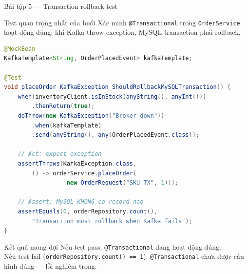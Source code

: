 \documentclass[aspectratio=169,10pt]{beamer}
\begin{document}
\begin{frame}[fragile]{Bài tập 5 --- Transaction rollback test}
  \begin{block}{Test quan trọng nhất của buổi}
    Xác minh \texttt{@Transactional} trong \texttt{OrderService} hoạt động đúng:
    khi Kafka throw exception, MySQL transaction phải rollback.
  \end{block}

\begin{lstlisting}[language=Java]
@MockBean
KafkaTemplate<String, OrderPlacedEvent> kafkaTemplate;

@Test
void placeOrder_KafkaException_ShouldRollbackMySQLTransaction() {
    when(inventoryClient.isInStock(anyString(), anyInt()))
        .thenReturn(true);
    doThrow(new KafkaException("Broker down"))
        .when(kafkaTemplate)
        .send(anyString(), any(OrderPlacedEvent.class));

    // Act: expect exception
    assertThrows(KafkaException.class,
        () -> orderService.placeOrder(
                  new OrderRequest("SKU-TX", 1)));

    // Assert: MySQL KHONG co record nao
    assertEquals(0, orderRepository.count(),
        "Transaction must rollback when Kafka fails");
}
\end{lstlisting}

  \begin{exampleblock}{Kết quả mong đợi}
    Nếu test pass: \texttt{@Transactional} đang hoạt động đúng.\\
    Nếu test fail (\texttt{orderRepository.count() == 1}):
    \texttt{@Transactional} chưa được cấu hình đúng --- lỗi nghiêm trọng.
  \end{exampleblock}
\end{frame}
\end{document}
